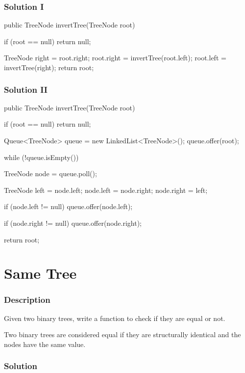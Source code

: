 \subsubsection{Solution I}

\begin{Code}
public TreeNode invertTree(TreeNode root) {
    if (root == null) {
        return null;
    }

    TreeNode right = root.right;
    root.right = invertTree(root.left);
    root.left = invertTree(right);
    return root;
}
\end{Code}

\subsubsection{Solution II}

\begin{Code}
public TreeNode invertTree(TreeNode root) {
    if (root == null) {
        return null;
    }

    Queue<TreeNode> queue = new LinkedList<TreeNode>();
    queue.offer(root);

    while (!queue.isEmpty()) {
        TreeNode node = queue.poll();

        TreeNode left = node.left;
        node.left = node.right;
        node.right = left;

        if (node.left != null) {
            queue.offer(node.left);
        }

        if (node.right != null) {
            queue.offer(node.right);
        }
    }

    return root;
}
\end{Code}

\newpage

\section{Same Tree} %

\subsubsection{Description}

Given two binary trees, write a function to check if they are equal or not.

Two binary trees are considered equal if they are structurally identical and the nodes have the same value.

\subsubsection{Solution}

